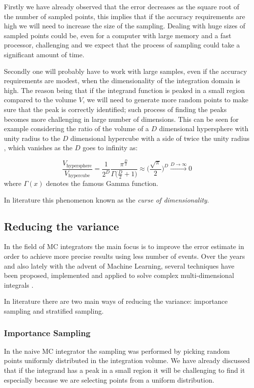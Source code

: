 \documentclass[../main/main.tex]{subfiles}
\begin{document}
Firstly we have already observed that the error decreases as the square root of the number of sampled points, 
this implies that if the accuracy requirements are high we will need to increase the size of the sampling. 
Dealing with huge sizes of sampled points could be, even for a computer with large memory and a fast processor, 
challenging and we expect that the process of sampling could take a significant amount of time.

Secondly one will probably have to work with large samples, even if the accuracy requirements are modest, when
the dimensionality of the integration domain is high. The reason being that if the integrand function is peaked in a small
region compared to the volume $V$, we will need to generate more random points to make sure that the peak is correctly 
identified; such process of finding the peaks becomes more challenging in large number of dimensions.
This can be seen for example considering the ratio of the volume of a $D$ dimensional hypersphere with unity radius to the $D$ dimensional hypercube with a side of twice the unity radius , which vanishes as the $D$ goes to infinity as:

\begin{equation}
	\frac{V_{\text{hypersphere}}}{V_{\text{hypercube} }} = \frac{1}{2^D} \frac{\pi^{\frac{D}{2}}}{\Gamma\big(\frac{D}{2} + 1\big)} \approx  \bigg( \frac{\sqrt{\pi}}{2} \bigg)^D \xrightarrow{D \rightarrow  \infty} 0
\end{equation}
where $\Gamma(x)$ denotes the famous Gamma function.

In literature this phenomenon known as the \emph{curse of dimensionality}.

\subsection{Reducing the variance}
\label{redu_var}
In the field of MC integrators the main focus is to improve the error estimate in order to achieve more precise results using less number of
events. Over the years and also lately with the advent of Machine Learning, several techniques have been proposed, implemented and applied to solve complex multi-dimensional integrals \cite{Lepage:2020tgj, Carrazza:2020rdn, unknown}.

In literature there are two main ways of reducing the variance: importance sampling and stratified sampling.

\subsubsection{Importance Sampling}
In the naive MC integrator the sampling was performed by picking random points uniformly distributed in the integration volume. 
We have already discussed that if the integrand has a peak in a small region it will be challenging to find it especially because we are selecting points from a uniform distribution. 
\end{document}
